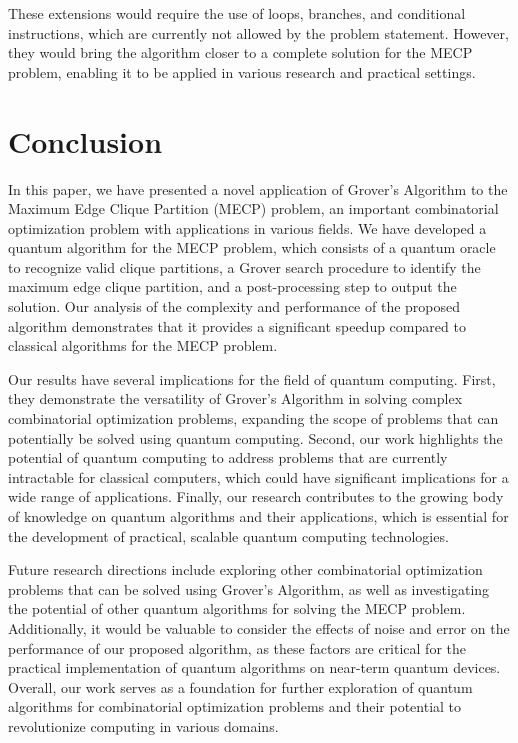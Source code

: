 These extensions would require the use of loops, branches, and conditional instructions, which are currently not allowed by the problem statement. However, they would bring the algorithm closer to a complete solution for the MECP problem, enabling it to be applied in various research and practical settings.

\section{Conclusion}

In this paper, we have presented a novel application of Grover's Algorithm to the Maximum Edge Clique Partition (MECP) problem, an important combinatorial optimization problem with applications in various fields. We have developed a quantum algorithm for the MECP problem, which consists of a quantum oracle to recognize valid clique partitions, a Grover search procedure to identify the maximum edge clique partition, and a post-processing step to output the solution. Our analysis of the complexity and performance of the proposed algorithm demonstrates that it provides a significant speedup compared to classical algorithms for the MECP problem.

Our results have several implications for the field of quantum computing. First, they demonstrate the versatility of Grover's Algorithm in solving complex combinatorial optimization problems, expanding the scope of problems that can potentially be solved using quantum computing. Second, our work highlights the potential of quantum computing to address problems that are currently intractable for classical computers, which could have significant implications for a wide range of applications. Finally, our research contributes to the growing body of knowledge on quantum algorithms and their applications, which is essential for the development of practical, scalable quantum computing technologies.

Future research directions include exploring other combinatorial optimization problems that can be solved using Grover's Algorithm, as well as investigating the potential of other quantum algorithms for solving the MECP problem. Additionally, it would be valuable to consider the effects of noise and error on the performance of our proposed algorithm, as these factors are critical for the practical implementation of quantum algorithms on near-term quantum devices. Overall, our work serves as a foundation for further exploration of quantum algorithms for combinatorial optimization problems and their potential to revolutionize computing in various domains.

